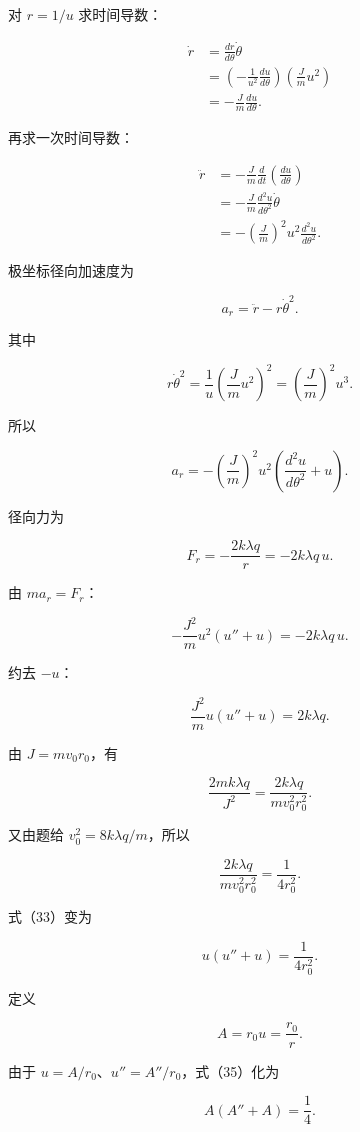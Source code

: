 \documentclass[12pt,a4paper,UTF8]{ctexart}
\begin{document}
对 \(r=1/u\) 求时间导数：

\[
\begin{aligned}
\dot r
&=\frac{dr}{d\theta}\dot\theta\\
&=\left(-\frac1{u^2}\frac{du}{d\theta}\right)
\left(\frac Jm u^2\right)\\
&=-\frac Jm\frac{du}{d\theta}. 
\end{aligned}
\tag{28}
\]

再求一次时间导数：

\[
\begin{aligned}
\ddot r
&=-\frac Jm\frac{d}{dt}\left(\frac{du}{d\theta}\right)\\
&=-\frac Jm\frac{d^2u}{d\theta^2}\dot\theta\\
&=-\left(\frac Jm\right)^2u^2\frac{d^2u}{d\theta^2}. 
\end{aligned}
\tag{29}
\]

极坐标径向加速度为

\[
a_r=\ddot r-r\dot\theta^2.
\]

其中

\[
r\dot\theta^2
=\frac1u\left(\frac Jm u^2\right)^2
=\left(\frac Jm\right)^2u^3. \tag{30}
\]

所以

\[
a_r
=-\left(\frac Jm\right)^2u^2
\left(\frac{d^2u}{d\theta^2}+u\right). \tag{31}
\]

径向力为

\[
F_r=-\frac{2k\lambda q}{r}=-2k\lambda q\,u. \tag{32}
\]

由 \(ma_r=F_r\)：

\[
-\frac{J^2}{m}u^2(u''+u)
=-2k\lambda q\,u.
\]

约去 \(-u\)：

\[
\frac{J^2}{m}u(u''+u)=2k\lambda q. \tag{33}
\]

由 \(J=mv_0r_0\)，有

\[
\frac{2mk\lambda q}{J^2}
=\frac{2k\lambda q}{mv_0^2r_0^2}.
\]

又由题给 \(v_0^2=8k\lambda q/m\)，所以

\[
\frac{2k\lambda q}{mv_0^2r_0^2}
=\frac1{4r_0^2}. \tag{34}
\]

式（33）变为

\[
u(u''+u)=\frac1{4r_0^2}. \tag{35}
\]

定义

\[
A=r_0u=\frac{r_0}{r}. \tag{36}
\]

由于 \(u=A/r_0\)、\(u''=A''/r_0\)，式（35）化为

\[
A(A''+A)=\frac14. \tag{37}
\]
\end{document}
